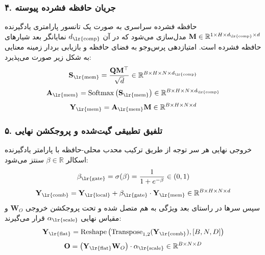 \subsubsection*{۴. جریان حافظه فشرده پیوسته }
حافظه فشرده سراسری به صورت یک تانسور پارامتری یادگیرنده $\mathbf{M} \in \mathbb{R}^{1 \times H \times d_{\text{\lr{comp}}} \times d}$ مدل‌سازی می‌شود که در آن $d_{\text{\lr{comp}}}$ نمایانگر بعد شیارهای حافظه فشرده  است. امتیازدهی پرس‌وجو به فضای حافظه و بازیابی بردار زمینه معنایی به شکل زیر صورت می‌پذیرد:
\begin{equation}
\mathbf{S}_{\text{\lr{mem}}} = \frac{\mathbf{Q} \mathbf{M}^\top}{\sqrt{d}} \in \mathbb{R}^{B \times H \times N \times d_{\text{\lr{comp}}}}
\end{equation}
\begin{equation}
\mathbf{A}_{\text{\lr{mem}}} = \operatorname{Softmax}\left( \mathbf{S}_{\text{\lr{mem}}} \right) \in \mathbb{R}^{B \times H \times N \times d_{\text{\lr{comp}}}}
\end{equation}
\begin{equation}
\mathbf{Y}_{\text{\lr{mem}}} = \mathbf{A}_{\text{\lr{mem}}} \mathbf{M} \in \mathbb{R}^{B \times H \times N \times d}
\end{equation}

\subsubsection*{۵. تلفیق تطبیقی گیت‌شده و پروجکشن نهایی}
خروجی نهایی هر سر توجه از طریق ترکیب محدب محلی-حافظه با پارامتر یادگیرنده اسکالر $\beta \in \mathbb{R}$ سنتز می‌شود:
\begin{equation}
\beta_{\text{\lr{gate}}} = \sigma(\beta) = \frac{1}{1 + e^{-\beta}} \in (0, 1)
\end{equation}
\begin{equation}
\mathbf{Y}_{\text{\lr{comb}}} = \mathbf{Y}_{\text{\lr{local}}} + \beta_{\text{\lr{gate}}} \cdot \mathbf{Y}_{\text{\lr{mem}}} \in \mathbb{R}^{B \times H \times N \times d}
\end{equation}
سپس سرها در راستای بعد ویژگی به هم متصل شده و تحت پروجکشن خروجی $\mathbf{W}_O$ و مقیاس نهایی $\alpha_{\text{\lr{scale}}}$ قرار می‌گیرند:
\begin{equation}
\mathbf{Y}_{\text{\lr{flat}}} = \operatorname{Reshape}\left( \operatorname{Transpose}_{1, 2}(\mathbf{Y}_{\text{\lr{comb}}}), [B, N, D] \right)
\end{equation}
\begin{equation}
\mathbf{O} = \left( \mathbf{Y}_{\text{\lr{flat}}} \mathbf{W}_O \right) \cdot \alpha_{\text{\lr{scale}}} \in \mathbb{R}^{B \times N \times D}
\end{equation}

